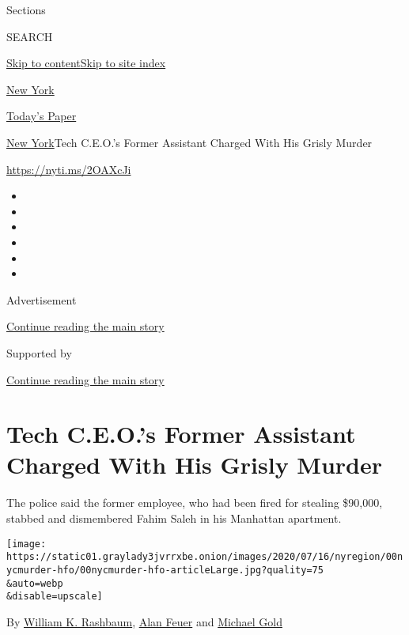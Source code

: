 Sections

SEARCH

\protect\hyperlink{site-content}{Skip to
content}\protect\hyperlink{site-index}{Skip to site index}

\href{https://www.nytimes3xbfgragh.onion/section/nyregion}{New York}

\href{https://myaccount.nytimes3xbfgragh.onion/auth/login?response_type=cookie\&client_id=vi}{}

\href{https://www.nytimes3xbfgragh.onion/section/todayspaper}{Today's
Paper}

\href{/section/nyregion}{New York}\textbar{}Tech C.E.O.'s Former
Assistant Charged With His Grisly Murder

\url{https://nyti.ms/2OAXcJi}

\begin{itemize}
\item
\item
\item
\item
\item
\item
\end{itemize}

Advertisement

\protect\hyperlink{after-top}{Continue reading the main story}

Supported by

\protect\hyperlink{after-sponsor}{Continue reading the main story}

\hypertarget{tech-ceos-former-assistant-charged-with-his-grisly-murder}{%
\section{Tech C.E.O.'s Former Assistant Charged With His Grisly
Murder}\label{tech-ceos-former-assistant-charged-with-his-grisly-murder}}

The police said the former employee, who had been fired for stealing
\$90,000, stabbed and dismembered Fahim Saleh in his Manhattan
apartment.

\texttt{[image: https://static01.graylady3jvrrxbe.onion/images/2020/07/16/nyregion/00nycmurder-hfo/00nycmurder-hfo-articleLarge.jpg?quality=75\\\&auto=webp\\\&disable=upscale]}

By
\href{https://www.nytimes3xbfgragh.onion/by/william-k-rashbaum}{William
K. Rashbaum},
\href{https://www.nytimes3xbfgragh.onion/by/alan-feuer}{Alan Feuer} and
\href{https://www.nytimes3xbfgragh.onion/by/michael-gold}{Michael Gold}

